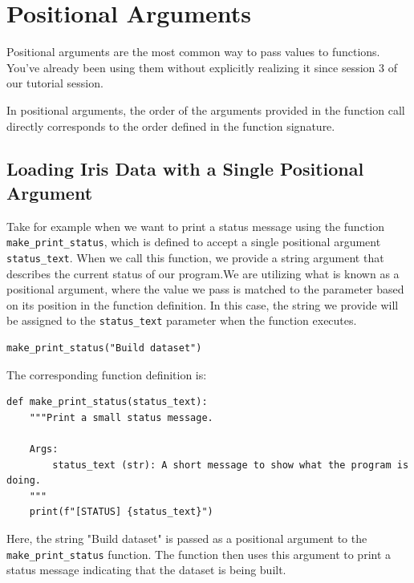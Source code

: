 \section{Positional Arguments}
Positional arguments are the most common way to pass values to functions. You've already been using them without explicitly realizing it since session 3 of our tutorial session.
 
In positional arguments, the order of the arguments provided in the function call directly corresponds to the order defined in the function signature.

\subsection{Loading Iris Data with a Single Positional Argument}

Take for example when we want to print a status message using the function \texttt{make\_print\_status}, which is defined to 
accept a single positional argument \texttt{status\_text}. When we call this function, we provide a string argument that describes the current status of our program.We are utilizing what is known as a positional argument, where the value we pass is matched to the parameter based on its position in the function definition. In this case, the string we provide will be assigned to the \texttt{status\_text} parameter when the function executes.



\begin{verbatim}
make_print_status("Build dataset")

\end{verbatim}

The corresponding function definition is:

\begin{verbatim}
def make_print_status(status_text):
    """Print a small status message.

    Args:
        status_text (str): A short message to show what the program is doing.
    """
    print(f"[STATUS] {status_text}")
\end{verbatim}

Here, the string "Build dataset" is passed as a positional argument to the \texttt{make\_print\_status} function. The function then uses this argument to print a status message indicating that the dataset is being built.



